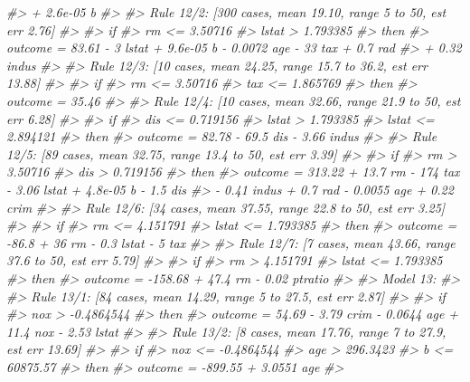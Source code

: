 \documentclass[]{book}
\newenvironment{Shaded}{\begin{snugshade}}{\end{snugshade}}
\newcommand{\CommentTok}[1]{\textcolor[rgb]{0.56,0.35,0.01}{\textit{#1}}}
\begin{document}
\begin{Shaded}
\begin{Highlighting}[]
\CommentTok{#>            + 2.6e-05 b}
\CommentTok{#> }
\CommentTok{#>   Rule 12/2: [300 cases, mean 19.10, range 5 to 50, est err 2.76]}
\CommentTok{#> }
\CommentTok{#>     if}
\CommentTok{#>  rm <= 3.50716}
\CommentTok{#>  lstat > 1.793385}
\CommentTok{#>     then}
\CommentTok{#>  outcome = 83.61 - 3 lstat + 9.6e-05 b - 0.0072 age - 33 tax + 0.7 rad}
\CommentTok{#>            + 0.32 indus}
\CommentTok{#> }
\CommentTok{#>   Rule 12/3: [10 cases, mean 24.25, range 15.7 to 36.2, est err 13.88]}
\CommentTok{#> }
\CommentTok{#>     if}
\CommentTok{#>  rm <= 3.50716}
\CommentTok{#>  tax <= 1.865769}
\CommentTok{#>     then}
\CommentTok{#>  outcome = 35.46}
\CommentTok{#> }
\CommentTok{#>   Rule 12/4: [10 cases, mean 32.66, range 21.9 to 50, est err 6.28]}
\CommentTok{#> }
\CommentTok{#>     if}
\CommentTok{#>  dis <= 0.719156}
\CommentTok{#>  lstat > 1.793385}
\CommentTok{#>  lstat <= 2.894121}
\CommentTok{#>     then}
\CommentTok{#>  outcome = 82.78 - 69.5 dis - 3.66 indus}
\CommentTok{#> }
\CommentTok{#>   Rule 12/5: [89 cases, mean 32.75, range 13.4 to 50, est err 3.39]}
\CommentTok{#> }
\CommentTok{#>     if}
\CommentTok{#>  rm > 3.50716}
\CommentTok{#>  dis > 0.719156}
\CommentTok{#>     then}
\CommentTok{#>  outcome = 313.22 + 13.7 rm - 174 tax - 3.06 lstat + 4.8e-05 b - 1.5 dis}
\CommentTok{#>            - 0.41 indus + 0.7 rad - 0.0055 age + 0.22 crim}
\CommentTok{#> }
\CommentTok{#>   Rule 12/6: [34 cases, mean 37.55, range 22.8 to 50, est err 3.25]}
\CommentTok{#> }
\CommentTok{#>     if}
\CommentTok{#>  rm <= 4.151791}
\CommentTok{#>  lstat <= 1.793385}
\CommentTok{#>     then}
\CommentTok{#>  outcome = -86.8 + 36 rm - 0.3 lstat - 5 tax}
\CommentTok{#> }
\CommentTok{#>   Rule 12/7: [7 cases, mean 43.66, range 37.6 to 50, est err 5.79]}
\CommentTok{#> }
\CommentTok{#>     if}
\CommentTok{#>  rm > 4.151791}
\CommentTok{#>  lstat <= 1.793385}
\CommentTok{#>     then}
\CommentTok{#>  outcome = -158.68 + 47.4 rm - 0.02 ptratio}
\CommentTok{#> }
\CommentTok{#> Model 13:}
\CommentTok{#> }
\CommentTok{#>   Rule 13/1: [84 cases, mean 14.29, range 5 to 27.5, est err 2.87]}
\CommentTok{#> }
\CommentTok{#>     if}
\CommentTok{#>  nox > -0.4864544}
\CommentTok{#>     then}
\CommentTok{#>  outcome = 54.69 - 3.79 crim - 0.0644 age + 11.4 nox - 2.53 lstat}
\CommentTok{#> }
\CommentTok{#>   Rule 13/2: [8 cases, mean 17.76, range 7 to 27.9, est err 13.69]}
\CommentTok{#> }
\CommentTok{#>     if}
\CommentTok{#>  nox <= -0.4864544}
\CommentTok{#>  age > 296.3423}
\CommentTok{#>  b <= 60875.57}
\CommentTok{#>     then}
\CommentTok{#>  outcome = -899.55 + 3.0551 age}
\CommentTok{#> }

\end{Highlighting}
\end{Shaded}
\end{document}
